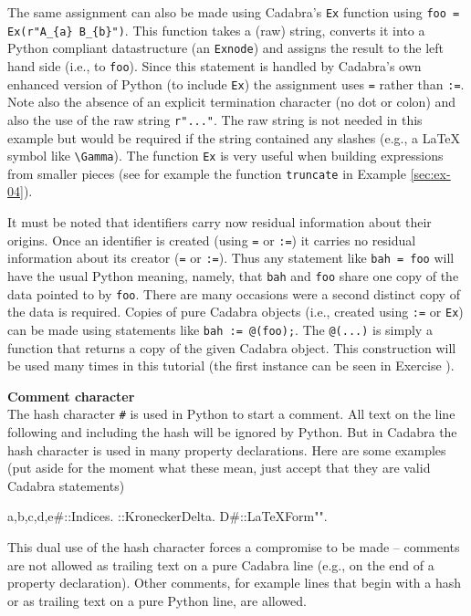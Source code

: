 \documentclass[a4paper,12pt]{article}
\numberwithin{equation}{section}%
\begin{document}
The same assignment can also be made using Cadabra's \verb|Ex| function using
\verb|foo = Ex(r"A_{a} B_{b}")|. This function takes a (raw) string, converts it into a
Python compliant datastructure (an \verb|Exnode|) and assigns the result to the left hand
side (i.e., to \verb|foo|). Since this statement is handled by Cadabra's own enhanced
version of Python (to include \verb|Ex|) the assignment uses \verb|=| rather than \verb|:=|.
Note also the absence of an explicit termination character (no dot or colon) and also the use
of the raw string \verb|r"..."|. The raw string is not needed in this example but would be
required if the string contained any slashes (e.g., a LaTeX symbol like \verb|\Gamma|). The
function \verb|Ex| is very useful when building expressions from smaller pieces (see for
example the function \verb|truncate| in Example \ref{sec:ex-04}).

It must be noted that identifiers carry now residual information about their origins. Once
an identifier is created (using \verb|=| or \verb|:=|) it carries no residual information
about its creator (\verb|=| or \verb|:=|). Thus any statement like \verb|bah = foo| will
have the usual Python meaning, namely, that \verb|bah| and \verb|foo| share one copy of the
data pointed to by \verb|foo|. There are many occasions were a second distinct copy of the
data is required. Copies of pure Cadabra objects (i.e., created using \verb|:=| or
\verb|Ex|) can be made using statements like \verb|bah := @(foo);|. The \verb|@(...)| is
simply a function that returns a copy of the given Cadabra object. This construction will be
used many times in this tutorial (the first instance can be seen in Exercise
).

{\bf Comment character}\\[5pt]
The hash character \verb|#| is used in Python to start a comment. All text on the line
following and including the hash will be ignored by Python. But in Cadabra the hash
character is used in many property declarations. Here are some examples (put aside for the
moment what these mean, just accept that they are valid Cadabra statements)
\begin{cadabra}[numbers=none]
   {a,b,c,d,e#}::Indices.
   \delta{#}::KroneckerDelta.
   D{#}::LaTeXForm{"\nabla"}.
\end{cadabra}
This dual use of the hash character forces a compromise to be made -- comments are not
allowed as trailing text on a pure Cadabra line (e.g., on the end of a property
declaration). Other comments, for example lines that begin with a hash or as trailing text
on a pure Python line, are allowed.
\end{document}
